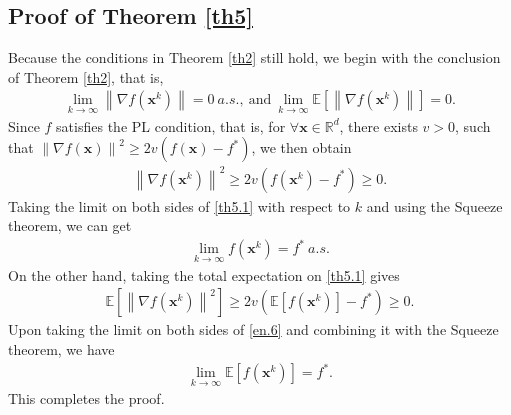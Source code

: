 \documentclass[twoside,11pt]{article}
\begin{document}
\subsection{Proof of Theorem \ref{th5}}\label{Proof of th5}
Because the conditions in Theorem \ref{th2} still hold, we begin with the conclusion of Theorem \ref{th2},  that is, 
\begin{equation}
   	\begin{aligned}
   	\lim_{k\rightarrow\infty} \left\| \nabla f(\mathbf{x}^k)\right\|=0\ a.s.,\ 
   	\text{and}\ \lim_{k\rightarrow\infty} \mathbb{E}\left[\left\| \nabla f(\mathbf{x}^k)\right\|\right]=0.\nonumber
   	\end{aligned}
\end{equation}
Since $f$ satisfies the PL condition,  that is,  for $\forall\mathbf{x}\in{\mathbb{R}^d}$, there exists $v>0$, such that $\left\| \nabla f(\mathbf{x})\right\|  ^2\ge2v(f(\mathbf{x})-f^*)$, we then obtain
\begin{align}\label{th5.1}
   	\left\| \nabla f(\mathbf{x}^k)\right\|^2
   	\ge 2v(f(\mathbf{x}^k)-f^*)
   	\ge 0.
\end{align}
Taking the limit on both sides of \eqref{th5.1} with respect to $k$ and using the Squeeze theorem, we can get
\begin{equation}
   	\begin{aligned}
   	\lim_{k\rightarrow\infty} f(\mathbf{x}^k)=f^*\ a.s.\nonumber
   	\end{aligned}
\end{equation}
On the other hand, taking the total expectation on \eqref{th5.1} gives
\begin{align}\label{en.6}
   	\mathbb{E}\left[ \left\| \nabla f(\mathbf{x}^k)\right\|^2\right] 
   	\ge 2v\left( \mathbb{E}\left[ f(\mathbf{x}^k)\right] -f^*\right) 
   	\ge 0.
\end{align}
Upon taking the limit on both sides of \eqref{en.6} and combining it with the Squeeze theorem, we have
\begin{equation}
   	\begin{aligned}
   	\lim_{k\rightarrow\infty} \mathbb{E}\left[f(\mathbf{x}^k)\right]=f^*.\nonumber
   	\end{aligned}
\end{equation}
This completes the proof.
\end{document}
